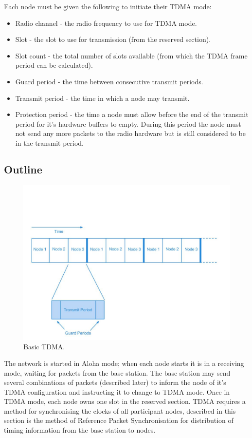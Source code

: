 \documentclass[parskip]{cs4rep}
\begin{document}
Each node must be given the following to initiate their TDMA mode:
\begin{itemize}
\item
Radio channel - the radio frequency to use for TDMA mode.
\item
Slot - the slot to use for transmission (from the reserved section).
\item
Slot count - the total number of slots available (from which the TDMA frame period can be calculated).
\item
Guard period - the time between consecutive transmit periods.
\item
Transmit period - the time in which a node may transmit.
\item
Protection period - the time a node must allow before the end of the transmit period for it’s hardware buffers to empty. During this period the node must not send any more packets to the radio hardware but is still considered to be in the transmit period.
\end{itemize}

\subsection{Outline}

\begin{figure}
	\centering
	\includegraphics[width=120mm]{tdma.jpg}
	\caption{Basic TDMA.}
\end{figure}

The network is started in Aloha mode; when each node starts it is in a receiving mode, waiting for packets from the base station. The base station may send several combinations of packets (described later) to inform the node of it’s TDMA configuration and instructing it to change to TDMA mode. Once in TDMA mode, each node owns one slot in the reserved section. TDMA requires a method for synchronising the clocks of all participant nodes, described in this section is the method of Reference Packet Synchronisation for distribution of timing information from the base station to nodes.
\end{document}

